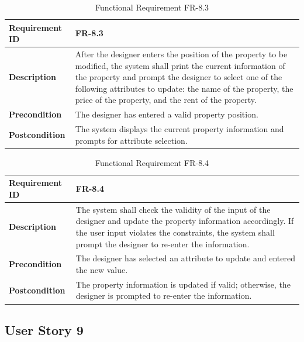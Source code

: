\documentclass{article}
\begin{document}
\begin{table}[ht]
    \centering
    \caption{Functional Requirement FR-8.3}
    \begin{tabular}{@{}P{3cm}P{12cm}@{}}
        \toprule
        \textbf{Requirement ID} & FR-8.3 \\ \midrule
        \textbf{Description} & After the designer enters the position of the property to be modified, the system shall print the current information of the property and prompt the designer to select one of the following attributes to update: the name of the property, the price of the property, and the rent of the property. \\ \midrule
        \textbf{Precondition} & The designer has entered a valid property position. \\ \midrule
        \textbf{Postcondition} & The system displays the current property information and prompts for attribute selection. \\ \bottomrule
    \end{tabular}
\end{table}

\begin{table}[ht]
    \centering
    \caption{Functional Requirement FR-8.4}
    \begin{tabular}{@{}P{3cm}P{12cm}@{}}
        \toprule
        \textbf{Requirement ID} & FR-8.4 \\ \midrule
        \textbf{Description} & The system shall check the validity of the input of the designer and update the property information accordingly. If the user input violates the constraints, the system shall prompt the designer to re-enter the information. \\ \midrule
        \textbf{Precondition} & The designer has selected an attribute to update and entered the new value. \\ \midrule
        \textbf{Postcondition} & The property information is updated if valid; otherwise, the designer is prompted to re-enter the information. \\ \bottomrule
    \end{tabular}
\end{table}

\clearpage
\subsection{User Story 9}
\end{document}
